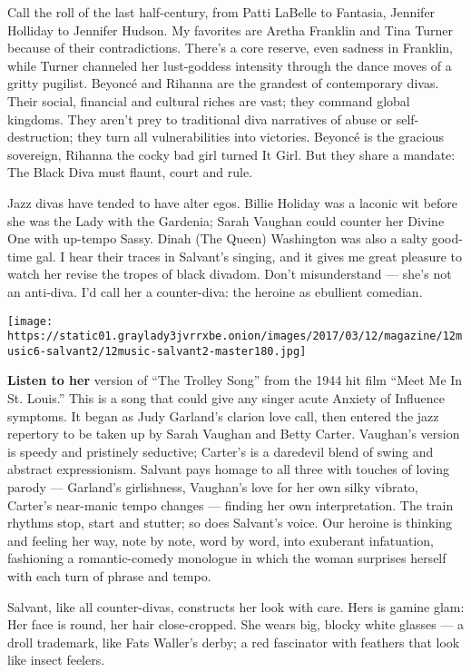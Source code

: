 Call the roll of the last half-century, from Patti LaBelle to Fantasia,
Jennifer Holliday to Jennifer Hudson. My favorites are Aretha Franklin
and Tina Turner because of their contradictions. There's a core reserve,
even sadness in Franklin, while Turner channeled her lust-goddess
intensity through the dance moves of a gritty pugilist. Beyoncé and
Rihanna are the grandest of contemporary divas. Their social, financial
and cultural riches are vast; they command global kingdoms. They aren't
prey to traditional diva narratives of abuse or self-destruction; they
turn all vulnerabilities into victories. Beyoncé is the gracious
sovereign, Rihanna the cocky bad girl turned It Girl. But they share a
mandate: The Black Diva must flaunt, court and rule.

Jazz divas have tended to have alter egos. Billie Holiday was a laconic
wit before she was the Lady with the Gardenia; Sarah Vaughan could
counter her Divine One with up-tempo Sassy. Dinah (The Queen) Washington
was also a salty good-time gal. I hear their traces in Salvant's
singing, and it gives me great pleasure to watch her revise the tropes
of black divadom. Don't misunderstand --- she's not an anti-diva. I'd
call her a counter-diva: the heroine as ebullient comedian.

\texttt{[image: https://static01.graylady3jvrrxbe.onion/images/2017/03/12/magazine/12music6-salvant2/12music-salvant2-master180.jpg]}

\textbf{Listen to her} version of ``The Trolley Song'' from the 1944 hit
film ``Meet Me In St. Louis.'' This is a song that could give any singer
acute Anxiety of Influence symptoms. It began as Judy Garland's clarion
love call, then entered the jazz repertory to be taken up by Sarah
Vaughan and Betty Carter. Vaughan's version is speedy and pristinely
seductive; Carter's is a daredevil blend of swing and abstract
expressionism. Salvant pays homage to all three with touches of loving
parody --- Garland's girlishness, Vaughan's love for her own silky
vibrato, Carter's near-manic tempo changes --- finding her own
interpretation. The train rhythms stop, start and stutter; so does
Salvant's voice. Our heroine is thinking and feeling her way, note by
note, word by word, into exuberant infatuation, fashioning a
romantic-comedy monologue in which the woman surprises herself with each
turn of phrase and tempo.

Salvant, like all counter-divas, constructs her look with care. Hers is
gamine glam: Her face is round, her hair close-cropped. She wears big,
blocky white glasses --- a droll trademark, like Fats Waller's derby; a
red fascinator with feathers that look like insect feelers.

